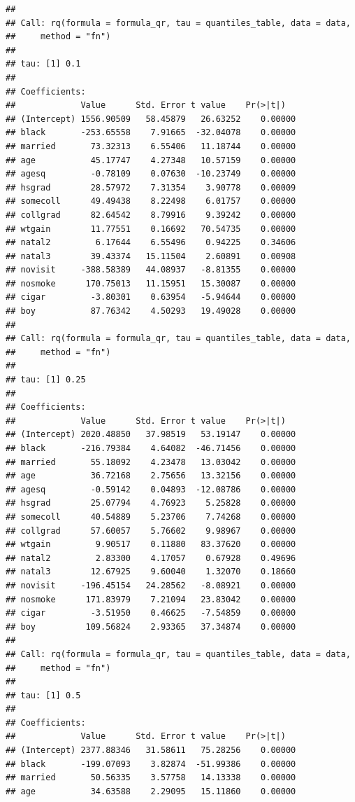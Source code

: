 \documentclass[]{book}
\begin{document}
\begin{verbatim}
## 
## Call: rq(formula = formula_qr, tau = quantiles_table, data = data, 
##     method = "fn")
## 
## tau: [1] 0.1
## 
## Coefficients:
##             Value      Std. Error t value    Pr(>|t|)  
## (Intercept) 1556.90509   58.45879   26.63252    0.00000
## black       -253.65558    7.91665  -32.04078    0.00000
## married       73.32313    6.55406   11.18744    0.00000
## age           45.17747    4.27348   10.57159    0.00000
## agesq         -0.78109    0.07630  -10.23749    0.00000
## hsgrad        28.57972    7.31354    3.90778    0.00009
## somecoll      49.49438    8.22498    6.01757    0.00000
## collgrad      82.64542    8.79916    9.39242    0.00000
## wtgain        11.77551    0.16692   70.54735    0.00000
## natal2         6.17644    6.55496    0.94225    0.34606
## natal3        39.43374   15.11504    2.60891    0.00908
## novisit     -388.58389   44.08937   -8.81355    0.00000
## nosmoke      170.75013   11.15951   15.30087    0.00000
## cigar         -3.80301    0.63954   -5.94644    0.00000
## boy           87.76342    4.50293   19.49028    0.00000
## 
## Call: rq(formula = formula_qr, tau = quantiles_table, data = data, 
##     method = "fn")
## 
## tau: [1] 0.25
## 
## Coefficients:
##             Value      Std. Error t value    Pr(>|t|)  
## (Intercept) 2020.48850   37.98519   53.19147    0.00000
## black       -216.79384    4.64082  -46.71456    0.00000
## married       55.18092    4.23478   13.03042    0.00000
## age           36.72168    2.75656   13.32156    0.00000
## agesq         -0.59142    0.04893  -12.08786    0.00000
## hsgrad        25.07794    4.76923    5.25828    0.00000
## somecoll      40.54889    5.23706    7.74268    0.00000
## collgrad      57.60057    5.76602    9.98967    0.00000
## wtgain         9.90517    0.11880   83.37620    0.00000
## natal2         2.83300    4.17057    0.67928    0.49696
## natal3        12.67925    9.60040    1.32070    0.18660
## novisit     -196.45154   24.28562   -8.08921    0.00000
## nosmoke      171.83979    7.21094   23.83042    0.00000
## cigar         -3.51950    0.46625   -7.54859    0.00000
## boy          109.56824    2.93365   37.34874    0.00000
## 
## Call: rq(formula = formula_qr, tau = quantiles_table, data = data, 
##     method = "fn")
## 
## tau: [1] 0.5
## 
## Coefficients:
##             Value      Std. Error t value    Pr(>|t|)  
## (Intercept) 2377.88346   31.58611   75.28256    0.00000
## black       -199.07093    3.82874  -51.99386    0.00000
## married       50.56335    3.57758   14.13338    0.00000
## age           34.63588    2.29095   15.11860    0.00000

\end{verbatim}
\end{document}
